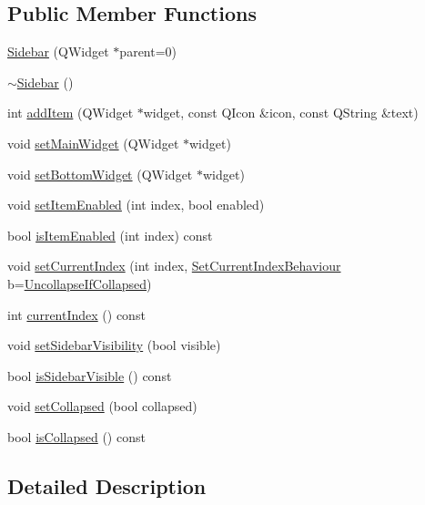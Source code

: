 \subsection*{Public Member Functions}
\begin{DoxyCompactItemize}
\item 
\hyperlink{classSidebar_ab143c40f6c4f3e2c4480d88c9ced8269}{Sidebar} (Q\+Widget $\ast$parent=0)
\item 
\hyperlink{classSidebar_ab52078a5886bdb0f0fdbdc81c5c04b46}{$\sim$\+Sidebar} ()
\item 
int \hyperlink{classSidebar_a642911afe1e9edd9d758df420a12a03d}{add\+Item} (Q\+Widget $\ast$widget, const Q\+Icon \&icon, const Q\+String \&text)
\item 
void \hyperlink{classSidebar_a33bb2672e2e75d2997ea116bd25feea2}{set\+Main\+Widget} (Q\+Widget $\ast$widget)
\item 
void \hyperlink{classSidebar_a4d2956c76781bec3fdffda29b699a75e}{set\+Bottom\+Widget} (Q\+Widget $\ast$widget)
\item 
void \hyperlink{classSidebar_a4284408c37255e81f294508f4cd19f76}{set\+Item\+Enabled} (int index, bool enabled)
\item 
bool \hyperlink{classSidebar_af8daf68e83b592177a830b7ec35de3db}{is\+Item\+Enabled} (int index) const 
\item 
void \hyperlink{classSidebar_a2e8f04dcf175f5d4dc5b6961a417611e}{set\+Current\+Index} (int index, \hyperlink{classSidebar_af06ad6ae553bd93cabeef79df1277342}{Set\+Current\+Index\+Behaviour} b=\hyperlink{classSidebar_af06ad6ae553bd93cabeef79df1277342acd60138922798b43dcd1004c95f00fb4}{Uncollapse\+If\+Collapsed})
\item 
int \hyperlink{classSidebar_a87085cfe9098de2cd21dff4f13f4df5a}{current\+Index} () const 
\item 
void \hyperlink{classSidebar_acab620fd1f317c5c40c5f5b162dfa77d}{set\+Sidebar\+Visibility} (bool visible)
\item 
bool \hyperlink{classSidebar_af919caad848a5f5079b275bdd4666409}{is\+Sidebar\+Visible} () const 
\item 
void \hyperlink{classSidebar_a3bcef186eab8bd313c0c4e92948e605a}{set\+Collapsed} (bool collapsed)
\item 
bool \hyperlink{classSidebar_a7faa5e2df81f4fc935dfc85cead3efe6}{is\+Collapsed} () const 
\end{DoxyCompactItemize}


\subsection{Detailed Description}


